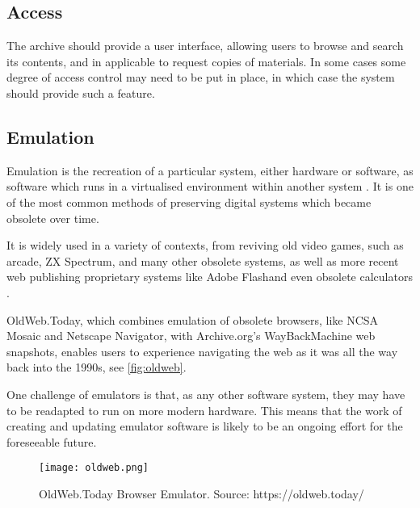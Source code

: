 \subsection{Access}

The archive should provide a user interface, allowing users to browse and search its contents, and in applicable to request copies of materials. In some cases some degree of access control may need to be put in place, in which case the system should provide such a feature. \cite{nationallibraryofaustraliaGuidelinesPreservationDigital2003}

\subsection{Emulation}

Emulation is the recreation of a particular system, either hardware or software, as software which runs in a virtualised environment within another system \cite{rothenbergUsingEmulationPreserve2000}. It is one of the most common methods of preserving digital systems which became obsolete over time.

It is widely used in a variety of contexts, from reviving old video games, such as arcade\footnotemark[1], ZX Spectrum\footnotemark[2], and many other obsolete systems\footnotemark[3], as well as more recent web publishing proprietary systems like Adobe Flash\footnotemark[4] and even obsolete calculators \cite{scottjasonCalculatedMoveCalculators2023}.


OldWeb.Today, which combines \gls{emulation} of obsolete browsers, like NCSA Mosaic and Netscape Navigator, with Archive.org's WayBackMachine web snapshots, enables users to experience navigating the web as it was all the way back into the 1990s, see \autoref{fig:oldweb}.

One challenge of emulators is that, as any other software system, they may have to be readapted to run on more modern hardware. This means that the work of creating and updating emulator software is likely to be an ongoing effort for the foreseeable future.

\begin{figure}[h]
    \centering
    \texttt{[image: oldweb.png]}
    \caption[OldWeb.Today Browser Emulator]{OldWeb.Today Browser Emulator. Source: https://oldweb.today/ }
    \label{fig:oldweb}
\end{figure}


